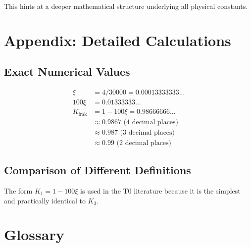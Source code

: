 	This hints at a deeper mathematical structure underlying all physical constants.
	
	\section{Appendix: Detailed Calculations}
	
	\subsection{Exact Numerical Values}
	
	\begin{align}
		\xi &= 4/30000 = 0.00013333333... \\
		100\xi &= 0.01333333... \\
		K_{\text{frak}} &= 1 - 100\xi = 0.98666666... \\
		&\approx 0.9867 \text{ (4 decimal places)} \\
		&\approx 0.987 \text{ (3 decimal places)} \\
		&\approx 0.99 \text{ (2 decimal places)}
	\end{align}
	
	\subsection{Comparison of Different Definitions}
	
	\begin{table}[h]
		\centering
		\caption{Different possible definitions and their values}
	\end{table}
	
	The form $K_1 = 1 - 100\xi$ is used in the T0 literature because it is the simplest and practically identical to $K_3$.
	
	\section{Glossary}
	
